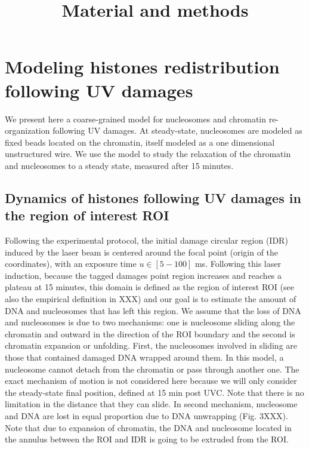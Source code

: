 \documentclass[12pt]{article}
\begin{document}
	
\title{ Material and methods}
\maketitle
\section{Modeling  histones redistribution following UV damages}
We present here a coarse-grained model for nucleosomes and chromatin re-organization following UV damages. At steady-state, nucleosomes are modeled as fixed beads located on the chromatin, itself modeled as a one dimensional unstructured wire. We use the model to study the relaxation of the chromatin and nucleosomes to a steady state, measured after 15 minutes.
\subsection{Dynamics of histones following UV damages in the region of interest ROI}
Following the experimental protocol, the initial damage circular region (IDR) induced by the laser beam is centered around the focal point (origin of the coordinates), with an exposure time $u \in [5-100]$ ms. Following this laser induction, because the tagged damages point region increases and reaches a plateau at 15 minutes, this domain is defined as the region of interest ROI (see also the empirical definition in XXX) and our goal is to estimate the amount of DNA and nucleosomes that has left this region. We assume that the loss of DNA and nucleosomes is due to two mechanisms: one is nucleosome sliding along the chromatin and outward in the direction of the ROI boundary and the second is chromatin expansion or unfolding. First, the nucleosomes involved in sliding are those that contained damaged DNA wrapped around them. In this model, a nucleosome cannot detach from the chromatin or pass through another one. The exact mechanism of motion is not considered here because we will only consider the steady-state final position, defined at 15 min post UVC. Note that there is no limitation in the distance that they can slide. In second mechanism, nucleosome and DNA are lost in equal proportion due to DNA unwrapping (Fig. 3XXX). Note that due to expansion of chromatin, the DNA and nucleosome located in the annulus between the ROI and IDR is going to be extruded from the ROI.
\end{document}
